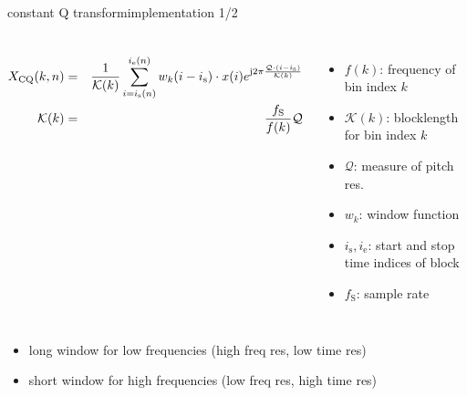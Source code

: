         \begin{frame}{constant Q transform}{implementation 1/2}
            
            \begin{columns}
            \begin{eqnarray*}
                X_\mathrm{CQ}(k,n) &=& \frac{1}{\mathcal{K}(k)}\sum\limits_{i=i_{\mathrm{s}}(n)}^{i_{\mathrm{e}}(n)}{w_k(i-i_{\mathrm{s}})\cdot x(i) {e}^{\mathrm{j}2\pi \frac{\mathcal{Q}\cdot(i-i_{\mathrm{s}})}{\mathcal{K}(k)}}}\\
                \mathcal{K}(k) &=& \frac{f_{\mathrm{S}}}{f(k)} \mathcal{Q}
            \end{eqnarray*} 
            
            \begin{itemize}
                \item   $f(k)$: frequency of bin index $k$
                \item   $\mathcal{K}(k)$: blocklength for bin index $k$
                \item   $\mathcal{Q}$: measure of pitch res.
                \item   $w_k$: window function
                \item   $i_\mathrm{s},i_\mathrm{e}$: start and stop time indices of block
                \item   $f_\mathrm{S}$: sample rate
            \end{itemize}
            \end{columns}
            \bigskip
            \begin{itemize}
                \item   long window for low frequencies (high freq res, low time res)
                \item   short window for high frequencies (low freq res, high time res)
            \end{itemize}
        \end{frame}	

